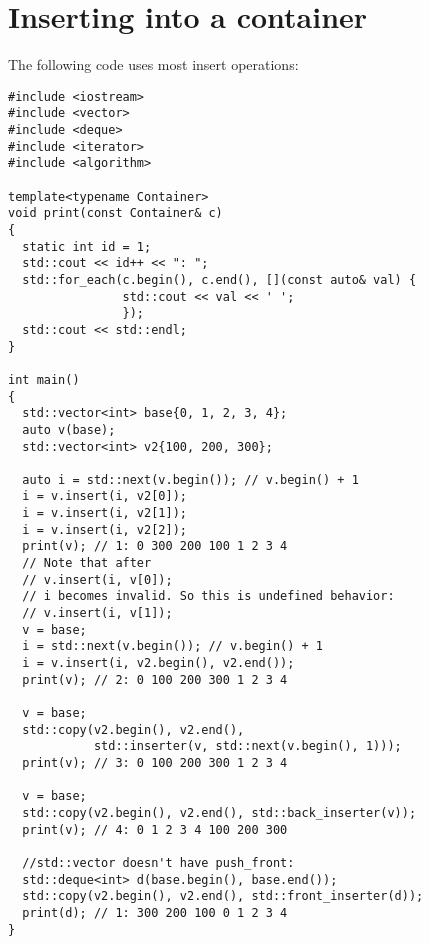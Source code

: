 \documentclass{book}
\begin{document}
	\section{Inserting into a container}
	The following code uses most insert operations:
	\begin{lstlisting}
#include <iostream>
#include <vector>
#include <deque>
#include <iterator>
#include <algorithm>

template<typename Container>
void print(const Container& c)
{
  static int id = 1;
  std::cout << id++ << ": ";
  std::for_each(c.begin(), c.end(), [](const auto& val) {
                std::cout << val << ' ';
                });
  std::cout << std::endl;
}

int main()
{
  std::vector<int> base{0, 1, 2, 3, 4};
  auto v(base);
  std::vector<int> v2{100, 200, 300};

  auto i = std::next(v.begin()); // v.begin() + 1
  i = v.insert(i, v2[0]);
  i = v.insert(i, v2[1]);
  i = v.insert(i, v2[2]);
  print(v); // 1: 0 300 200 100 1 2 3 4
  // Note that after
  // v.insert(i, v[0]);
  // i becomes invalid. So this is undefined behavior:
  // v.insert(i, v[1]);
  v = base;
  i = std::next(v.begin()); // v.begin() + 1
  i = v.insert(i, v2.begin(), v2.end());
  print(v); // 2: 0 100 200 300 1 2 3 4
        
  v = base;
  std::copy(v2.begin(), v2.end(),
            std::inserter(v, std::next(v.begin(), 1)));
  print(v); // 3: 0 100 200 300 1 2 3 4
  
  v = base;
  std::copy(v2.begin(), v2.end(), std::back_inserter(v));
  print(v); // 4: 0 1 2 3 4 100 200 300
  
  //std::vector doesn't have push_front:
  std::deque<int> d(base.begin(), base.end());
  std::copy(v2.begin(), v2.end(), std::front_inserter(d));
  print(d); // 1: 300 200 100 0 1 2 3 4
}
	\end{lstlisting}
\end{document}
